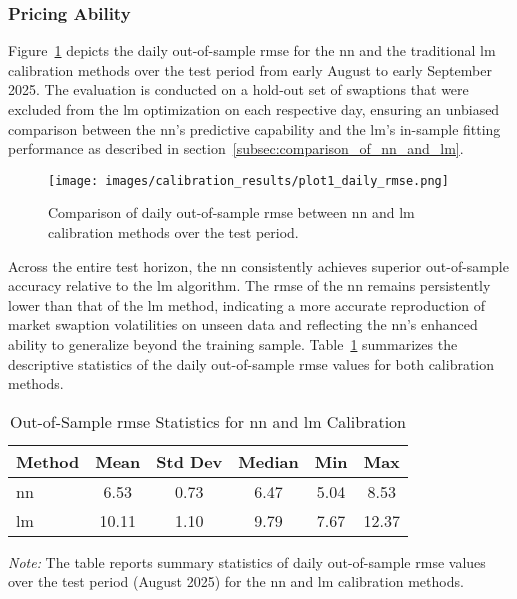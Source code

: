 \subsubsection{Pricing Ability}
Figure~\ref{fig:daily_rmse_comparison} depicts the daily out-of-sample \ac{rmse} for the \ac{nn} and the traditional \ac{lm} calibration methods over the test period from early August to early September 2025. The evaluation is conducted on a hold-out set of swaptions that were excluded from the \ac{lm} optimization on each respective day, ensuring an unbiased comparison between the \ac{nn}'s predictive capability and the \ac{lm}'s in-sample fitting performance as described in section~\ref{subsec:comparison_of_nn_and_lm}.

\begin{figure}[H]
	\centering
	\texttt{[image: images/calibration\_results/plot1\_daily\_rmse.png]}
	\caption{Comparison of daily out-of-sample \ac{rmse} between \ac{nn} and \ac{lm} calibration methods over the test period.}
	\label{fig:daily_rmse_comparison}
\end{figure}

Across the entire test horizon, the \ac{nn} consistently achieves superior out-of-sample accuracy relative to the \ac{lm} algorithm. The \ac{rmse} of the \ac{nn} remains persistently lower than that of the \ac{lm} method, indicating a more accurate reproduction of market swaption volatilities on unseen data and reflecting the \ac{nn}'s enhanced ability to generalize beyond the training sample. Table~\ref{tab:rmse_statistics} summarizes the descriptive statistics of the daily out-of-sample \ac{rmse} values for both calibration methods.

\begin{table}[htbp]
	\centering
	\begin{threeparttable}
		\caption{Out-of-Sample \ac{rmse} Statistics for \ac{nn} and \ac{lm} Calibration}
		\label{tab:rmse_statistics}
		\begin{tabular}{lccccc}
			\toprule
			\textbf{Method} & \textbf{Mean} & \textbf{Std Dev} & \textbf{Median} & \textbf{Min} & \textbf{Max} \\
			\midrule
			\ac{nn}         & 6.53          & 0.73             & 6.47            & 5.04         & 8.53         \\
			\ac{lm}         & 10.11         & 1.10             & 9.79            & 7.67         & 12.37        \\
			\bottomrule
		\end{tabular}
		\begin{tablenotes}
			\footnotesize
			\item \textit{Note:} The table reports summary statistics of daily out-of-sample \ac{rmse} values over the test period (August 2025) for the \ac{nn} and \ac{lm} calibration methods.
		\end{tablenotes}
	\end{threeparttable}
\end{table}

